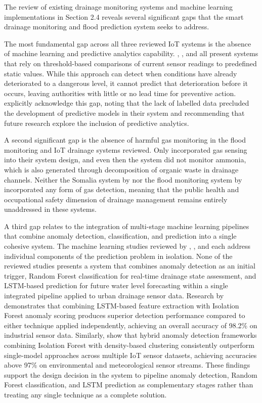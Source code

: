 \documentclass[12pt, a4paper]{article}
\begin{document}
The review of existing drainage monitoring systems and machine learning implementations in Section 2.4 reveals several significant gaps that the smart drainage monitoring and flood prediction system seeks to address.

The most fundamental gap across all three reviewed IoT systems is the absence of machine learning and predictive analytics capability. \citet{sonawane2018}, \citet{nageye2025}, and \citet{kumar2025} all present systems that rely on threshold-based comparisons of current sensor readings to predefined static values. While this approach can detect when conditions have already deteriorated to a dangerous level, it cannot predict that deterioration before it occurs, leaving authorities with little or no lead time for preventive action. \citet{nageye2025} explicitly acknowledge this gap, noting that the lack of labelled data precluded the development of predictive models in their system and recommending that future research explore the inclusion of predictive analytics.

A second significant gap is the absence of harmful gas monitoring in the flood monitoring and IoT drainage systems reviewed. Only \citet{sonawane2018} incorporated gas sensing into their system design, and even then the system did not monitor ammonia, which is also generated through decomposition of organic waste in drainage channels. Neither the Somalia system by \citet{nageye2025} nor the flood monitoring system by \citet{kumar2025} incorporated any form of gas detection, meaning that the public health and occupational safety dimension of drainage management remains entirely unaddressed in these systems.

A third gap relates to the integration of multi-stage machine learning pipelines that combine anomaly detection, classification, and prediction into a single cohesive system. The machine learning studies reviewed by \citet{sathiyamoorthy2025}, \citet{bao2025}, and \citet{banupriya2025} each address individual components of the prediction problem in isolation. None of the reviewed studies presents a system that combines anomaly detection as an initial trigger, Random Forest classification for real-time drainage state assessment, and LSTM-based prediction for future water level forecasting within a single integrated pipeline applied to urban drainage sensor data. Research by \citet{gandhimathinathan2024} demonstrates that combining LSTM-based feature extraction with Isolation Forest anomaly scoring produces superior detection performance compared to either technique applied independently, achieving an overall accuracy of 98.2\% on industrial sensor data. Similarly, \citet{yogarajan2025} show that hybrid anomaly detection frameworks combining Isolation Forest with density-based clustering consistently outperform single-model approaches across multiple IoT sensor datasets, achieving accuracies above 97\% on environmental and meteorological sensor streams. These findings support the design decision in the system to pipeline anomaly detection, Random Forest classification, and LSTM prediction as complementary stages rather than treating any single technique as a complete solution.
\end{document}

